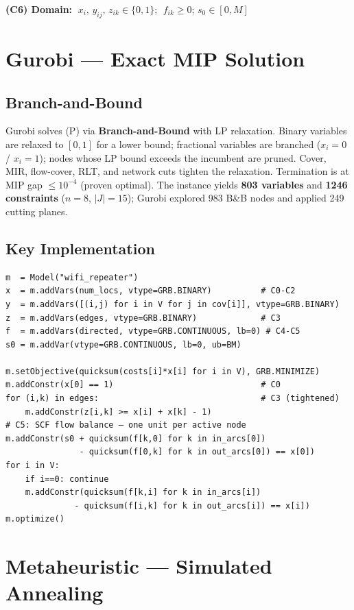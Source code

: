 \documentclass[10pt,a4paper,twocolumn]{article}
\begin{document}
\textbf{(C6) Domain:}
$\;x_i,\,y_{ij},\,z_{ik}\in\{0,1\}$;\;
$\;f_{ik}\geq 0$;\; $s_0\in[0,M]$

\section{Gurobi — Exact MIP Solution}

\subsection{Branch-and-Bound}

Gurobi solves (P) via \textbf{Branch-and-Bound} with LP relaxation.
Binary variables are relaxed to $[0,1]$ for a lower bound; fractional
variables are branched ($x_i{=}0$ / $x_i{=}1$); nodes whose LP bound
exceeds the incumbent are pruned. Cover, MIR, flow-cover, RLT, and
network cuts tighten the relaxation. Termination is at MIP gap
$\leq 10^{-4}$ (proven optimal). The instance yields
\textbf{803 variables} and \textbf{1246 constraints}
($n{=}8$, $|J|{=}15$); Gurobi explored 983 B\&B nodes and applied
249 cutting planes.

\subsection{Key Implementation}

\begin{lstlisting}
m  = Model("wifi_repeater")
x  = m.addVars(num_locs, vtype=GRB.BINARY)          # C0-C2
y  = m.addVars([(i,j) for i in V for j in cov[i]], vtype=GRB.BINARY)
z  = m.addVars(edges, vtype=GRB.BINARY)             # C3
f  = m.addVars(directed, vtype=GRB.CONTINUOUS, lb=0) # C4-C5
s0 = m.addVar(vtype=GRB.CONTINUOUS, lb=0, ub=BM)

m.setObjective(quicksum(costs[i]*x[i] for i in V), GRB.MINIMIZE)
m.addConstr(x[0] == 1)                              # C0
for (i,k) in edges:                                 # C3 (tightened)
    m.addConstr(z[i,k] >= x[i] + x[k] - 1)
# C5: SCF flow balance — one unit per active node
m.addConstr(s0 + quicksum(f[k,0] for k in in_arcs[0])
               - quicksum(f[0,k] for k in out_arcs[0]) == x[0])
for i in V:
    if i==0: continue
    m.addConstr(quicksum(f[k,i] for k in in_arcs[i])
              - quicksum(f[i,k] for k in out_arcs[i]) == x[i])
m.optimize()
\end{lstlisting}

\section{Metaheuristic — Simulated Annealing}
\end{document}
